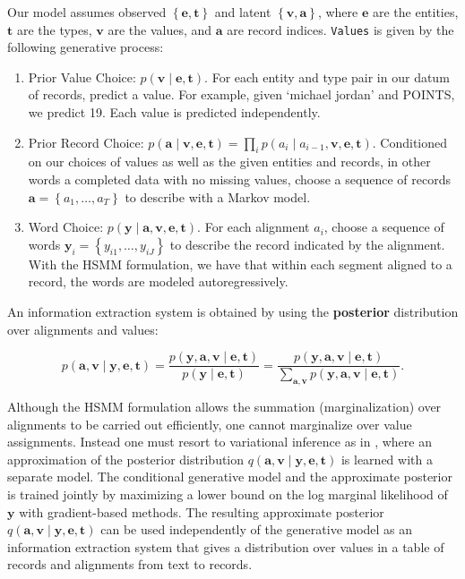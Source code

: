 \documentclass[12pt]{article}
\newcommand\set[1]{\left\{#1\right\}}
\newcommand{\ba}{\mathbf{a}}
\newcommand{\be}{\mathbf{e}}
\newcommand{\bt}{\mathbf{t}}
\newcommand{\bv}{\mathbf{v}}
\newcommand{\by}{\mathbf{y}}
\begin{document}
Our model assumes observed $\set{\be,\bt}$ and latent $\set{\bv,\ba}$, 
where $\be$ are the entities, $\bt$ are the types, $\bv$ are the values, and $\ba$ are
record indices.
\texttt{Values} is given by the following generative process:
\begin{enumerate}
\item Prior Value Choice: $p(\bv\mid\be,\bt)$.
For each entity and type pair in our datum of records, predict a value.
For example, given `michael jordan' and POINTS, we predict 19.
Each value is predicted independently.
\item Prior Record Choice: $p(\ba\mid\bv,\be,\bt) = \prod_i p(a_i\mid a_{i-1},\bv,\be,\bt)$.
Conditioned on our choices of values as well as the given entities and records,
in other words a completed data with no missing values,
choose a sequence of records $\ba = \set{a_1,\ldots,a_T}$ to describe with a Markov model.
\item Word Choice: $p(\by\mid\ba,\bv,\be,\bt)$.
For each alignment $a_i$,
choose a sequence of words $\by_i = \set{y_{i1},\ldots,y_{iJ}}$ to describe the record
indicated by the alignment.
With the HSMM formulation, we have that within each segment aligned to a record,
the words are modeled autoregressively.
\end{enumerate}
An information extraction system is obtained by using the 
\textbf{posterior} distribution over alignments and values:
\begin{linenomath*}
$$
p(\ba,\bv\mid\by,\be,\bt)=\frac{p(\by,\ba,\bv\mid\be,\bt)}{p(\by\mid\be,\bt)}
=\frac{p(\by,\ba,\bv\mid\be,\bt)}{\sum_{\ba,\bv} p(\by,\ba,\bv\mid\be,\bt)}.
$$
\end{linenomath*}
Although the HSMM formulation allows the summation (marginalization) over alignments to be carried out efficiently,
one cannot marginalize over value assignments.
Instead one must resort to variational inference as in \citet{deng2018attn},
where an approximation of the posterior distribution $q(\ba,\bv\mid\by,\be,\bt)$
is learned with a separate model.
The conditional generative model and the approximate posterior is trained jointly 
by maximizing a lower bound on the log marginal likelihood of $\by$ with gradient-based methods.
The resulting approximate posterior $q(\ba,\bv\mid\by,\be,\bt)$ can be used independently of the 
generative model as an information extraction system that gives a distribution over
values in a table of records and alignments from text to records.
\end{document}
